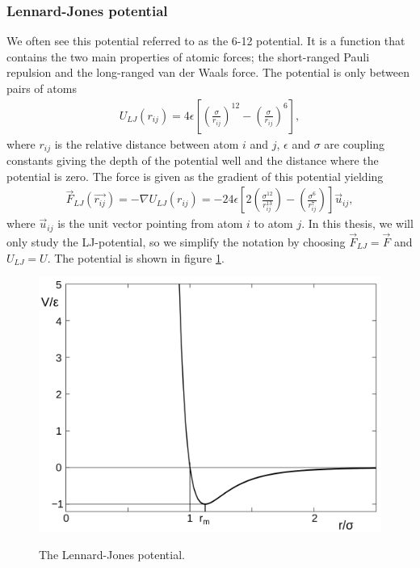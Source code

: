 \subsubsection{Lennard-Jones potential}
\label{sec:md_lj_potential}
We often see this potential referred to as the 6-12 potential. It is a function that contains the two main properties of atomic forces; the short-ranged Pauli repulsion and the long-ranged van der Waals force. The potential is only between pairs of atoms
\begin{align}
	\label{eq:md_potential_energy}
	U_{LJ}(r_{ij}) = 4\epsilon\left[\left(\frac{\sigma}{r_{ij}}\right)^{12} - \left(\frac{\sigma}{r_{ij}}\right)^{6}\right],
\end{align}
where $r_{ij}$ is the relative distance between atom $i$ and $j$, $\epsilon$ and $\sigma$ are coupling constants giving the depth of the potential well and the distance where the potential is zero. The force is given as the gradient of this potential yielding 
\begin{align}
	\label{eq:md_lj_force}
	\vec F_{LJ}(\vec{r_{ij}}) = -\nabla U_{LJ}(r_{ij}) = -24\epsilon\left[2\left(\frac{\sigma^{12}}{r_{ij}^{13}}\right) - \left(\frac{\sigma^6}{r_{ij}^7}\right)\right]\vec u_{ij},
\end{align}
where $\vec u_{ij}$ is the unit vector pointing from atom $i$ to atom $j$. In this thesis, we will only study the LJ-potential, so we simplify the notation by choosing $\vec F_{LJ} = \vec F$ and $U_{LJ} = U$. The potential is shown in figure \ref{fig:md_lennard_jones}.
\begin{figure}[h]
\begin{center}
\includegraphics[width=1.0\textwidth, trim=0cm 0cm 0cm 0cm, clip]{MD/figures/lennard_jones.png}
\label{fig:md_lennard_jones}
\end{center}
\caption{The Lennard-Jones potential.}
\end{figure}
